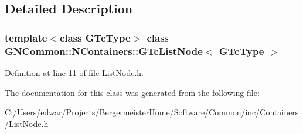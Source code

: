 \subsection{Detailed Description}
\subsubsection*{template$<$class G\+Tc\+Type$>$\newline
class G\+N\+Common\+::\+N\+Containers\+::\+G\+Tc\+List\+Node$<$ G\+Tc\+Type $>$}



Definition at line \mbox{\hyperlink{_list_node_8h_source_l00011}{11}} of file \mbox{\hyperlink{_list_node_8h_source}{List\+Node.\+h}}.



The documentation for this class was generated from the following file\+:\begin{DoxyCompactItemize}
\item 
C\+:/\+Users/edwar/\+Projects/\+Bergermeister\+Home/\+Software/\+Common/inc/\+Containers/List\+Node.\+h\end{DoxyCompactItemize}
